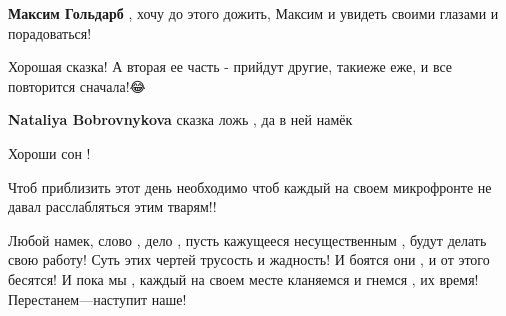 \begin{itemize}
\begin{itemize}
 
\textbf{Максим Гольдарб} , хочу до этого дожить, Максим и увидеть своими глазами и порадоваться!
\end{itemize}

 
Хорошая сказка! А вторая ее часть - прийдут другие, такиеже еже, и все повторится сначала!😂

\begin{itemize}
 
\textbf{Nataliya Bobrovnykova} сказка ложь , да в ней намёк
\end{itemize}

 
Хороши сон !


Чтоб приблизить этот день необходимо чтоб каждый на своем микрофронте не давал
расслабляться этим тварям!!

Любой намек, слово , дело , пусть кажущееся несущественным , будут делать свою
работу! Суть этих чертей трусость и жадность! И боятся они , и от этого
бесятся! И пока мы , каждый на своем месте кланяемся и гнемся , их время!
Перестанем—наступит наше!

\begin{itemize}
 

\end{itemize}
\end{itemize}
